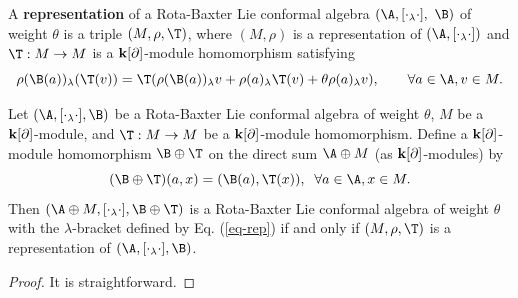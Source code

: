 \documentclass[12pt]{amsart}
\begin{document}
    \begin{definition}
A {\bf representation} of a    Rota-Baxter Lie
conformal algebra $(\A,[\cdot_\lambda\cdot],$ $\B)$ of weight  $\theta$ is a triple
$(M,\rho,\T)$, where $(M,\rho)$ is a representation of
$(\A,[\cdot_\lambda \cdot])$ and $\T:M\rightarrow M$ is a ${\bf
k}[\partial]$-module homomorphism satisfying
\begin{equation*}%
    \rho(\B (a))_\lambda (\T (v))=\T(\rho (\B(a))_\lambda v+\rho(a)_\lambda \T (v)+\theta\rho(a)_\lambda v),\qquad
    \forall a\in \A, v\in M.
\end{equation*}

\end{definition}

\begin{proposition}\label{pp-sprb}
Let $(\A,[\cdot_\lambda\cdot], \B)$ be a
Rota-Baxter Lie conformal algebra of weight  $\theta$, $M$ be a ${\bf
k}[\partial]$-module, and $\T:M\rightarrow M$ be a ${\bf
k}[\partial]$-module homomorphism. Define a ${\bf
k}[\partial]$-module homomorphism $\B\oplus\T$ on the direct sum
$\A\oplus M$ (as ${\bf k}[\partial]$-modules)
 by
$$(\B\oplus\T)(a,x)=(\B (a),\T (x)),\;\; \forall a\in \A, x\in
M.$$ Then $(\A\oplus M,[\cdot_\lambda \cdot], \B\oplus \T)$ is a
   Rota-Baxter Lie conformal algebra of weight  $\theta$ with the
$\lambda$-bracket defined by Eq. (\ref{eq-rep})  if and only if
$(M,\rho,\T) $ is a representation of
$(\A,[\cdot_\lambda\cdot],\B)$.
\end{proposition}

\begin{proof}
It is straightforward.
\end{proof}
\end{document}

